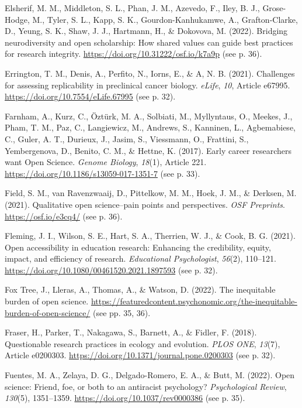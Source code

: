 \documentclass[authordate, empirical,issue]{jote-new-article}
\begin{document}
Elsherif, M. M., Middleton, S. L., Phan, J. M., Azevedo, F., Iley, B. J., Grose-Hodge, M., Tyler, S. L., Kapp, S. K., Gourdon-Kanhukamwe, A., Grafton-Clarke, D., Yeung, S. K., Shaw, J. J., Hartmann, H., \& Dokovova, M. (2022). Bridging neurodiversity and open scholarship: How shared values can guide best practices for research integrity. \url{https://doi.org/10.31222/osf.io/k7a9p} (see p. 36).

Errington, T. M., Denis, A., Perfito, N., Iorns, E., \& A, N. B. (2021). Challenges for assessing replicability in preclinical cancer biology. \emph{eLife}, \emph{10}, Article e67995. \url{https://doi.org/10.7554/eLife.67995} (see p. 32).

Farnham, A., Kurz, C., Öztürk, M. A., Solbiati, M., Myllyntaus, O., Meekes, J., Pham, T. M., Paz, C., Langiewicz, M., Andrews, S., Kanninen, L., Agbemabiese, C., Guler, A. T., Durieux, J., Jasim, S., Viessmann, O., Frattini, S., Yembergenova, D., Benito,
C. M., \& Hettne, K. (2017). Early career researchers want Open Science. \emph{Genome Biology}, \emph{18}(1), Article 221. \url{https://doi.org/10.1186/s13059-017-1351-7} (see p. 33).

Field, S. M., van Ravenzwaaij, D., Pittelkow, M. M., Hoek, J. M., \& Derksen, M. (2021). Qualitative open science–pain points and perspectives. \emph{OSF Preprints}. \url{https://osf.io/e3cq4/} (see p. 36).

Fleming, J. I., Wilson, S. E., Hart, S. A., Therrien, W. J., \& Cook, B. G. (2021). Open accessibility in education research: Enhancing the credibility, equity, impact, and efficiency of research. \emph{Educational Psychologist}, \emph{56}(2), 110–121. \url{https://doi.org/10.1080/00461520.2021.1897593} (see p. 32).

Fox Tree, J., Lleras, A., Thomas, A., \& Watson, D. (2022). The inequitable burden of open science. \url{https://featuredcontent.psychonomic.org/the-inequitable-burden-of-open-science/} (see pp. 35, 36).

Fraser, H., Parker, T., Nakagawa, S., Barnett, A., \& Fidler, F. (2018). Questionable research practices in ecology and evolution. \emph{PLOS ONE}, \emph{13}(7), Article e0200303. \url{https://doi.org/10.1371/journal.pone.0200303} (see p. 32).

Fuentes, M. A., Zelaya, D. G., Delgado-Romero, E. A., \& Butt, M. (2022). Open science: Friend, foe, or both to an antiracist psychology? \emph{Psychological Review}, \emph{130}(5), 1351–1359. \url{https://doi.org/10.1037/rev0000386} (see p. 35).
\end{document}
